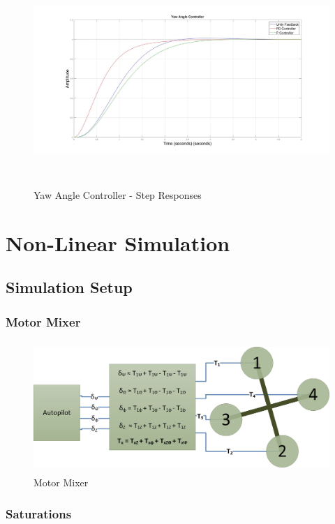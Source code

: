 		\begin{figure}[H]
			\centering
			\includegraphics[height = 8cm]{../Design/Matlab/Controllers/yaw_angle_step.jpg}
			\caption{Yaw Angle Controller -  Step Responses}
			\label{IM_YawAngleStep}
		\end{figure}
		
		\section{Non-Linear Simulation}\label{SECT_Nonlinear}
		\subsection{Simulation Setup}
		\subsubsection{Motor Mixer}		
		\begin{figure}[H]
			\centering
			\includegraphics[height = 5cm]{../References/Diagrams/MotorMixer.jpg}
			\caption{Motor Mixer}
			\label{IM_MotorMixer}
		\end{figure}	
		\subsubsection{Saturations}
		

